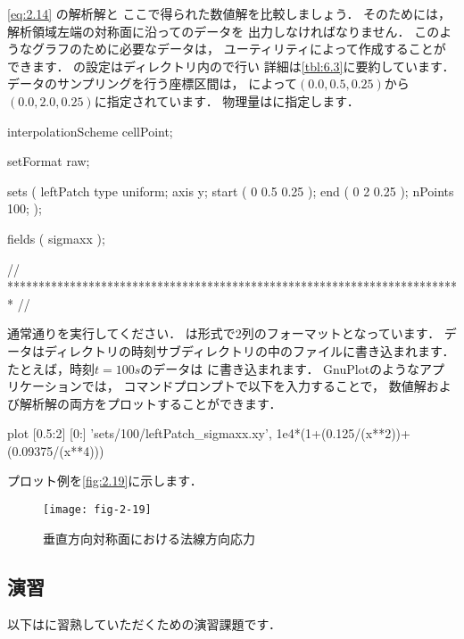\autoref{eq:2.14} の解析解と
ここで得られた数値解を比較しましょう．
そのためには，解析領域左端の対称面に沿ってのデータを
出力しなければなりません．
このようなグラフのために必要なデータは，
ユーティリティによって作成することができます．
の設定はディレクトリ内ので行い
詳細は\autoref{tbl:6.3}に要約しています．
データのサンプリングを行う座標区間は，
によって$(0.0, 0.5, 0.25)$から$(0.0, 2.0, 0.25)$に指定されています．
物理量はに指定します．
\begin{OFverbatim}[file, linenum=17]

interpolationScheme cellPoint;

setFormat       raw;

sets
(
    leftPatch
    {
        type    uniform;
        axis    y;
        start   ( 0 0.5 0.25 );
        end     ( 0 2 0.25 );
        nPoints 100;
    }
);

fields          ( sigmaxx );


// ************************************************************************* //
\end{OFverbatim}
通常通りを実行してください．
%
%
は形式で2列のフォーマットとなっています．
データはディレクトリの時刻サブディレクトリの中のファイルに書き込まれます．
たとえば，時刻$t = 100\unit{s}$のデータは
に書き込まれます．
GnuPlotのようなアプリケーションでは，
コマンドプロンプトで以下を入力することで，
数値解および解析解の両方をプロットすることができます．
\begin{OFverbatim}[terminal]
plot [0.5:2] [0:] 'sets/100/leftPatch_sigmaxx.xy',
     1e4*(1+(0.125/(x**2))+(0.09375/(x**4)))
\end{OFverbatim}
プロット例を\autoref{fig:2.19}に示します．


\begin{figure}[ht]
 \texttt{[image: fig-2-19]}
 \caption{垂直方向対称面における法線方向応力}
 \label{fig:2.19}
\end{figure}


\subsection{演習}
\label{ssec:2.2.4}
以下はに習熟していただくための演習課題です．

